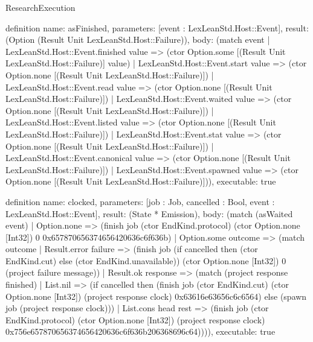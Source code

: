 \begin{lexlean}{ResearchExecution}
\begin{semanticmodule}
definition{
  name: asFinished,
  parameters: [event : LexLeanStd.Host::Event],
  result: (Option (Result Unit LexLeanStd.Host::Failure)),
  body: (match event
    | LexLeanStd.Host::Event.finished value => (ctor Option.some [(Result Unit LexLeanStd.Host::Failure)] value)
    | LexLeanStd.Host::Event.start value => (ctor Option.none [(Result Unit LexLeanStd.Host::Failure)])
    | LexLeanStd.Host::Event.read value => (ctor Option.none [(Result Unit LexLeanStd.Host::Failure)])
    | LexLeanStd.Host::Event.waited value => (ctor Option.none [(Result Unit LexLeanStd.Host::Failure)])
    | LexLeanStd.Host::Event.listed value => (ctor Option.none [(Result Unit LexLeanStd.Host::Failure)])
    | LexLeanStd.Host::Event.stat value => (ctor Option.none [(Result Unit LexLeanStd.Host::Failure)])
    | LexLeanStd.Host::Event.canonical value => (ctor Option.none [(Result Unit LexLeanStd.Host::Failure)])
    | LexLeanStd.Host::Event.spawned value => (ctor Option.none [(Result Unit LexLeanStd.Host::Failure)])),
  executable: true
}

definition{
  name: clocked,
  parameters: [job : Job, cancelled : Bool, event : LexLeanStd.Host::Event],
  result: (State * Emission),
  body: (match (asWaited event) | Option.none => (finish job (ctor EndKind.protocol) (ctor Option.none [Int32]) 0 0x657870656374656420636c6f636b) | Option.some outcome => (match outcome | Result.error failure => (finish job (if cancelled then (ctor EndKind.cut) else (ctor EndKind.unavailable)) (ctor Option.none [Int32]) 0 (project failure message)) | Result.ok response => (match (project response finished) | List.nil => (if cancelled then (finish job (ctor EndKind.cut) (ctor Option.none [Int32]) (project response clock) 0x63616e63656c6c6564) else (spawn job (project response clock))) | List.cons head rest => (finish job (ctor EndKind.protocol) (ctor Option.none [Int32]) (project response clock) 0x756e657870656374656420636c6f636b206368696c64)))),
  executable: true
}


\end{semanticmodule}
\end{lexlean}
